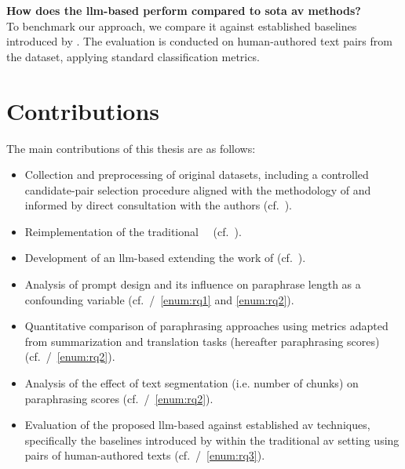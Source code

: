 \begin{questions}
    \item \textbf{How does the \ac{llm}-based \impAppr{} perform compared to \acl{sota} \ac{av} methods?} \label{enum:rq3} \hfill \\
    To benchmark our approach, we compare it against established baselines introduced by \citet{koppel_determining_2014}.
    The evaluation is conducted on human-authored text pairs from the \dataStudent{} dataset, applying standard classification metrics. 
    
\end{questions}



\section{Contributions}
\label{sec:contributions}
The main contributions of this thesis are as follows:
\begin{itemize}
    \item Collection and preprocessing of original datasets, including a controlled candidate-pair selection procedure aligned with the methodology of \citet{koppel_determining_2014} and informed by direct consultation with the authors (cf.~).
    \item Reimplementation of the traditional \impAppr{}~\citep{koppel_determining_2014}\ (cf.~).
    \item Development of an \ac{llm}-based \impAppr{} extending the work of \citet{koppel_determining_2014} (cf.~). 
    \item Analysis of prompt design and its influence on paraphrase length as a confounding variable (cf.~/~\ref{enum:rq1} and \ref{enum:rq2}).
    \item Quantitative comparison of paraphrasing approaches using metrics adapted from summarization and translation tasks (hereafter paraphrasing scores) (cf.~/~\ref{enum:rq2}).
    \item Analysis of the effect of text segmentation (i.e. number of chunks) on paraphrasing scores (cf.~/~\ref{enum:rq2}).
    \item Evaluation of the proposed \ac{llm}-based \impAppr{} against established \ac{av} techniques, specifically the baselines introduced by \citet{koppel_determining_2014}
    within the traditional \ac{av} setting using pairs of human-authored texts (cf.~/~\ref{enum:rq3}).
   
\end{itemize}



